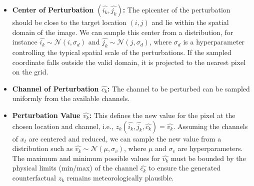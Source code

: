 \begin{itemize}
	\item \textbf{Center of Perturbation $(\widehat{i_k}, \widehat{j_k})$:} The epicenter of the perturbation should be close to the target location $(i, j)$ and lie within the spatial domain of the image. We can sample this center from a distribution, for instance $\widehat{i_k} \sim \mathcal{N}(i, \sigma_d)$ and $\widehat{j_k} \sim \mathcal{N}(j, \sigma_d)$, where $\sigma_d$ is a hyperparameter controlling the typical spatial scale of the perturbations. If the sampled coordinate falls outside the valid domain, it is projected to the nearest pixel on the grid.
	
	\item \textbf{Channel of Perturbation $\widehat{c_k}$:} The channel to be perturbed can be sampled uniformly from the available channels.
	
	\item \textbf{Perturbation Value $\widehat{v_k}$:} This defines the new value for the pixel at the chosen location and channel, i.e., $z_k(\widehat{i_k}, \widehat{j_k}, \widehat{c_k}) = \widehat{v_k}$. Assuming the channels of $x_t$ are centered and reduced, we can sample the new value from a distribution such as $\widehat{v_k} \sim \mathcal{N}(\mu, \sigma_v)$, where $\mu$ and $\sigma_v$ are hyperparameters. The maximum and minimum possible values for $\widehat{v_k}$ must be bounded by the physical limits (min/max) of the channel $\widehat{c_k}$ to ensure the generated counterfactual $z_k$ remains meteorologically plausible.
\end{itemize}

